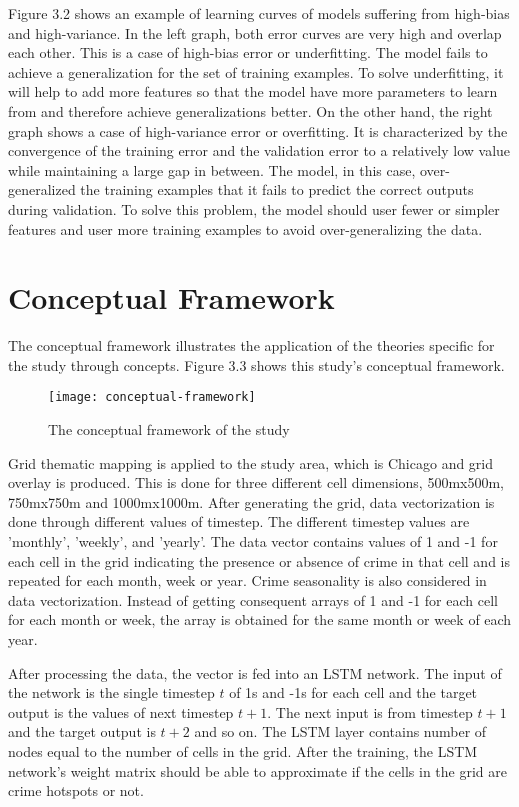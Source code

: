 Figure 3.2 shows an example of learning curves of models suffering from high-bias and high-variance. In the left graph, both error curves are very high and overlap each other. This is a case of high-bias error or underfitting. The model fails to achieve a generalization for the set of training examples. To solve underfitting, it will help to add more features so that the model have more parameters to learn from and therefore achieve generalizations better. On the other hand, the right graph shows a case of high-variance error or overfitting. It is characterized by the convergence of the training error and the validation error to a relatively low value while maintaining a large gap in between. The model, in this case, over-generalized the training examples that it fails to predict the correct outputs during validation. To solve this problem, the model should user fewer or simpler features and user more training examples to avoid over-generalizing the data.

\section{Conceptual Framework}
The conceptual framework illustrates the application of the theories specific for the study through concepts. Figure 3.3 shows this study's conceptual framework.
\begin{figure}[H]
    \centering
    \texttt{[image: conceptual-framework]}
    \caption{The conceptual framework of the study}
\end{figure}
Grid thematic mapping is applied to the study area, which is Chicago and grid overlay is produced. This is done for three different cell dimensions, 500mx500m, 750mx750m and 1000mx1000m. After generating the grid, data vectorization is done through different values of timestep. The different timestep values are 'monthly', 'weekly', and 'yearly'. The data vector contains values of 1 and -1 for each cell in the grid indicating the presence or absence of crime in that cell and is repeated for each month, week or year. Crime seasonality is also considered in data vectorization. Instead of getting consequent arrays of 1 and -1 for each cell for each month or week, the array is obtained for the same month or week of each year.

After processing the data, the vector is fed into an LSTM network. The input of the network is the single timestep $t$ of 1s and -1s for each cell and the target output is the values of next timestep $t+1$. The next input is from timestep $t+1$ and the target output is $t+2$ and so on. The LSTM layer contains number of nodes equal to the number of cells in the grid. After the training, the LSTM network's weight matrix should be able to approximate if the cells in the grid are crime hotspots or not.

